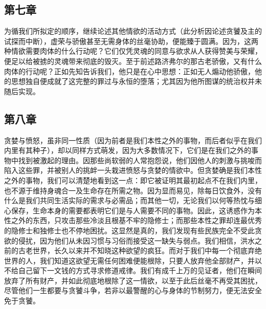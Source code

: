 
\subsection{第七章}

\par

为循我们所拟定的顺序，继续论述其他情欲的活动方式（此分析因论述贪饕及主的试探而中断），虚荣与骄傲甚至无需身体的丝毫协助，便能臻于圆满。因为，这两种情欲需要肉体的什么行动呢？它们仅凭灵魂的同意与欲求从人获得赞美与荣耀，便足以给被掳的灵魂带来彻底的毁灭。至于前述路济弗尔的那古老骄傲，又有什么肉体的行动呢？正如先知告诉我们，他只是在心中思想：正如无人煽动他骄傲，他的思想独自便成就了这完整的罪过与永恒的堕落；尤其因为他所图谋的统治权并未随后实现。\par


\subsection{第八章}

\par

贪婪与愤怒，虽非同一性质（因为前者是我们本性之外的事物，而后者似乎在我们内里有其种子），却以同样方式萌发，因为大多数情况下，它们是在我们之外的事物中找到被激起的理由。因那些尚软弱的人常抱怨说，他们因他人的刺激与挑唆而陷入这些罪，并被别人的挑衅一头栽进愤怒与贪婪的情欲中。但贪婪确是我们本性之外的事物，我们可以清楚地看到这一点：即它被证明其最初起点不在我们内里，也不源于维持身魂合一及生命存在所需之物。因为显而易见，除每日饮食外，没有什么是我们共同生活实际的需求与必需品；而其他一切，无论我们以何等热忱与细心保存，生命本身的需要都表明它们是与人需要不同的事物。因此，这诱惑作为本性之外的东西，只攻击那些冷淡且根基不牢的隐修士；而那些本性之罪却连最优秀的隐修士和独修士也不停地困扰。这显然是真的，我们发现有些民族完全不受此贪欲的侵扰，因为他们从未因习惯与习俗而接受这一缺失与弱点。我们相信，洪水之前的古老世界，长久以来并不知晓这种欲望的疯狂。而对于我们中每一个彻底弃绝世界的人，我们知道这欲望无需任何困难便能根除，只要人放弃他全部财产，并以不给自己留下一文钱的方式寻求修道戒律。我们有成千上万的见证者，他们在瞬间放弃了所有财产，并如此彻底地根除了这一情欲，以至于此后丝毫不再受其困扰，尽管他们一生都要与贪饕斗争，若非以最警醒的心与身体的节制努力，便无法安全免于贪饕。\par

